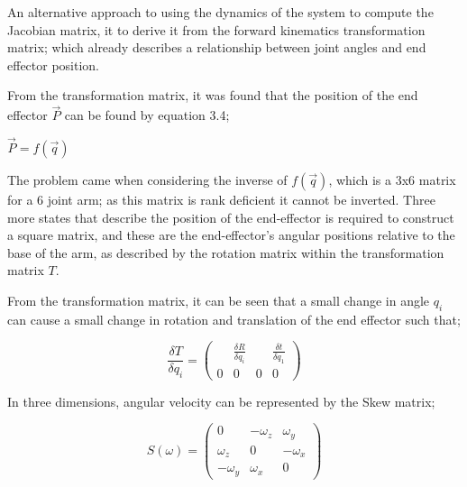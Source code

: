 \documentclass[12pt,openany,a4paper]{book}
\begin{document}
\vspace{\baselineskip}
An alternative approach to using the dynamics of the system to compute the Jacobian matrix, it to derive it from the forward kinematics transformation matrix; which already describes a relationship between joint angles and end effector position. 

From the transformation matrix, it was found that the position of the end effector $\vec{P}$ can be found by equation 3.4;

\vspace{\baselineskip}
\begin{center}
$\vec{P} = f( \vec{q} )$
\end{center}

\vspace{\baselineskip}
The problem came when considering the inverse of $f(\vec{q})$, which is a 3x6 matrix for a 6 joint arm; as this matrix is rank deficient it cannot be inverted. Three more states that describe the position of the end-effector is required to construct a square matrix, and these are the end-effector's angular positions relative to the base of the arm, as described by the rotation matrix within the transformation matrix $T$.

From the transformation matrix, it can be seen that a small change in angle $q_i$ can cause a small change in rotation and translation of the end effector such that;

\vspace{\baselineskip}
\begin{equation}
\frac{\delta T}{\delta q_i} = 
\left(\begin{array}{cccc} & \frac{\delta R}{\delta q_i} & & \frac{\delta t}{\delta q_1}  \\ 0 & 0 & 0 & 0 \end{array}\right)
\end{equation}

\vspace{\baselineskip}
In three dimensions, angular velocity can be represented by the Skew matrix;

\vspace{\baselineskip}
\begin{equation}
S(\omega) = 
 \left(\begin{array}{ccc} 0 & -\omega_z & \omega_y \\ \omega_z & 0 & -\omega_x  \\ -\omega_y & \omega_x & 0 \end{array}\right)
\end{equation}
\end{document}
